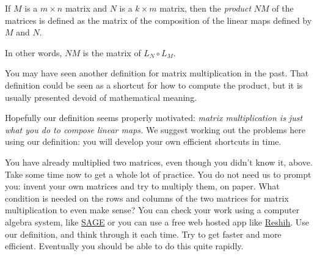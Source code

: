 \documentclass{ximera}
\begin{document}
\begin{definition}
  If $M$ is a $m\times n$ matrix and $N$ is a $k \times m$ matrix,
  then the \textit{product} $NM$ of the matrices is defined as the
  matrix of the composition of the linear maps defined by $M$ and $N$.

  In other words, $NM$ is the matrix of $L_N \circ L_M$.
\end{definition}

\begin{warning}
  You may have seen another definition for matrix multiplication in
  the past.  That definition could be seen as a shortcut for how to
  compute the product, but it is usually presented devoid of
  mathematical meaning.

  Hopefully our definition seems properly motivated: \textit{matrix
    multiplication is just what you do to compose linear maps.} We
  suggest working out the problems here using our definition: you will
  develop your own efficient shortcuts in time.
\end{warning}

You have already multiplied two matrices, even though you didn't know it, above.  Take some time now to get a whole lot of practice.  You do not need
us to prompt you:  invent your own matrices and try to multiply them, on paper.  What condition is needed on the rows and columns of the two matrices for matrix
multiplication to even make sense? You can check your work using a computer algebra system, like 
\href{http://www.sagemath.org/}{SAGE} or you can use a free web hosted app like \href{http://matrix.reshish.com/}{Reshih}.  Use our definition, and think through it 
each time.  Try to get faster and more efficient.  Eventually you should be able to do this quite rapidly.
\end{document}
